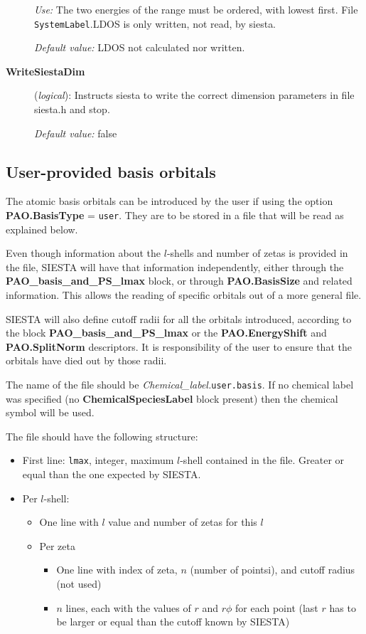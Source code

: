 \begin{description}
{\it Use:} The two energies of the range must be ordered,
with lowest first.
File {\tt SystemLabel}.LDOS is only written, not read, by siesta.

{\it Default value:} LDOS not calculated nor written.
        

\item[{\bf WriteSiestaDim}] ({\it logical}): 
Instructs siesta to write the correct dimension parameters in
file siesta.h and stop.

{\it Default value:} false

\end{description}
        

\subsection{User-provided basis orbitals}

The atomic basis orbitals can be introduced by the user if using
the option {\bf PAO.BasisType} = {\tt user}. They are to be stored in
a file that will be read as explained below. 

Even though information
about the $l$-shells and number of zetas is provided in the file,
SIESTA will have that information independently, either through the
{\bf PAO\_basis\_and\_PS\_lmax} block, or through {\bf PAO.BasisSize}
and related information. This allows the reading of specific orbitals
out of a more general file.

SIESTA will also define cutoff radii for all
the orbitals introduced, according to the block {\bf PAO\_basis\_and\_PS\_lmax}
or the {\bf PAO.EnergyShift} and {\bf PAO.SplitNorm} descriptors.
It is responsibility of the user to ensure that the orbitals have
died out by those radii.

The name of the file should be {\it Chemical\_label.}{\tt user.basis}.
If no chemical label was specified (no {\bf ChemicalSpeciesLabel} block
present) then the chemical symbol will be used.
 
The file should have the following structure:

\begin{itemize}
\item First line: {\tt lmax}, integer, maximum $l$-shell contained in 
the file. Greater or equal than the one expected by SIESTA.
\item Per $l$-shell: 
\begin{itemize}
\item One line with $l$ value and number of zetas for this $l$
\item Per zeta
\begin{itemize}
\item One line with index of zeta, $n$ (number of pointsi), and cutoff radius 
(not used)
\item $n$ lines, each with the values of $r$ and $r \phi$ for each point
(last $r$ has to be larger or equal than the cutoff known by SIESTA) 
\end{itemize}
\end{itemize}
\end{itemize}


